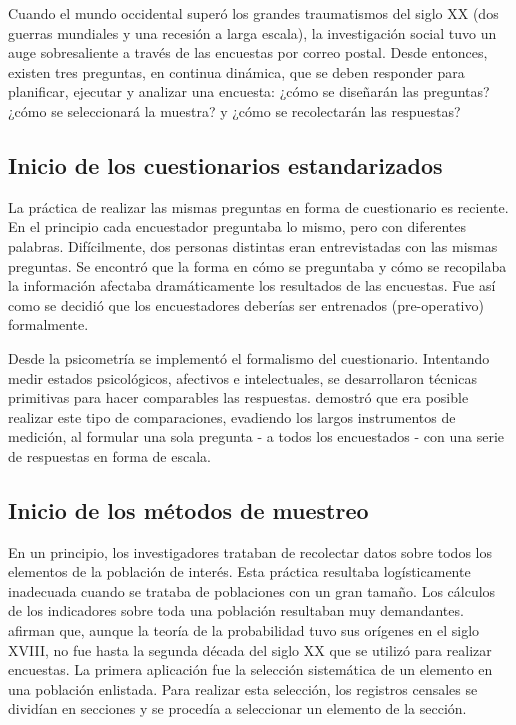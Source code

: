 \documentclass[
  12pt,
  spanish,
]{book}
\begin{document}
Cuando el mundo occidental superó los grandes traumatismos del siglo XX (dos guerras mundiales y una recesión a larga escala), la investigación social tuvo un auge sobresaliente a través de las encuestas por correo postal. Desde entonces, existen tres preguntas, en continua dinámica, que se deben responder para planificar, ejecutar y analizar una encuesta: ¿cómo se diseñarán las preguntas? ¿cómo se seleccionará la muestra? y ¿cómo se recolectarán las respuestas?

\hypertarget{inicio-de-los-cuestionarios-estandarizados}{%
\subsection{Inicio de los cuestionarios estandarizados}\label{inicio-de-los-cuestionarios-estandarizados}}

La práctica de realizar las mismas preguntas en forma de cuestionario es reciente. En el principio cada encuestador preguntaba lo mismo, pero con diferentes palabras. Difícilmente, dos personas distintas eran entrevistadas con las mismas preguntas. Se encontró que la forma en cómo se preguntaba y cómo se recopilaba la información afectaba dramáticamente los resultados de las encuestas. Fue así como se decidió que los encuestadores deberías ser entrenados (pre-operativo) formalmente.

Desde la psicometría se implementó el formalismo del cuestionario. Intentando medir estados psicológicos, afectivos e intelectuales, se desarrollaron técnicas primitivas para hacer comparables las respuestas. \citet{Likert_1932} demostró que era posible realizar este tipo de comparaciones, evadiendo los largos instrumentos de medición, al formular una sola pregunta - a todos los encuestados - con una serie de respuestas en forma de escala.

\hypertarget{inicio-de-los-muxe9todos-de-muestreo}{%
\subsection{Inicio de los métodos de muestreo}\label{inicio-de-los-muxe9todos-de-muestreo}}

En un principio, los investigadores trataban de recolectar datos sobre todos los elementos de la población de interés. Esta práctica resultaba logísticamente inadecuada cuando se trataba de poblaciones con un gran tamaño. Los cálculos de los indicadores sobre toda una población resultaban muy demandantes. \citet{Groves_Fowler_Couper_Lepkowski_Singer_Tourangeau_2009} afirman que, aunque la teoría de la probabilidad tuvo sus orígenes en el siglo XVIII, no fue hasta la segunda década del siglo XX que se utilizó para realizar encuestas. La primera aplicación fue la selección sistemática de un elemento en una población enlistada. Para realizar esta selección, los registros censales se dividían en secciones y se procedía a seleccionar un elemento de la sección.
\end{document}
